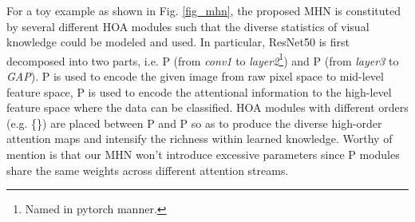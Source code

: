 \documentclass[10pt,twocolumn,letterpaper]{article}
\begin{document}
For a toy example as shown in Fig. \ref{fig_mhn}, the proposed MHN is constituted by several different HOA modules such that the diverse statistics of visual knowledge could be modeled and used. In particular, ResNet50 is first decomposed into two parts, i.e. P (from \emph{conv1} to \emph{layer2}\footnote{Named in pytorch \cite{pytorch} manner.}) and P (from \emph{layer3} to \emph{GAP}). P is used to encode the given image from raw pixel space to mid-level feature space, P is used to encode the attentional information to the high-level feature space where the data can be classified. HOA modules with different orders (e.g. \{\}) are placed between P and P so as to produce the diverse high-order attention maps and intensify the richness within learned knowledge. Worthy of mention is that our MHN won't introduce excessive parameters since P modules share the same weights across different attention streams.
\end{document}
